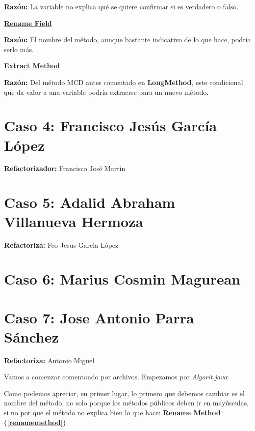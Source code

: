 \documentclass[11pt,a4paper,oneside]{book}
\begin{document}
    \textbf{Razón:} La variable no explica qué se quiere confirmar si es verdadero o falso.
    
    
    
    \hyperref[renamefield]{\textbf{Rename Field}}
    
    \textbf{Razón:} El nombre del método, aunque bastante indicativo de lo que hace, podría serlo más.
    
    
    
    \hyperref[extractmethod]{\textbf{Extract Method}}
    
    \textbf{Razón:} Del método MCD antes comentado en \textbf{LongMethod}, este condicional que da valor a una variable podría extraerse para un nuevo método.
    
    
    
    


\chapter {Caso 4: Francisco Jesús García López}
\textbf{Refactorizador:} Francisco José Martín







\chapter {Caso 5: Adalid Abraham Villanueva Hermoza}
\textbf{Refactoriza:} Fco Jesus Garcia López


\chapter {Caso 6: Marius Cosmin Magurean}

\chapter {Caso 7: Jose Antonio Parra Sánchez}
\textbf{Refactoriza:} Antonio Miguel

Vamos a comenzar comentando por archivos.
Empezamos por \emph{Algorit.java}:



Como podemos apreciar, en primer lugar, lo primero que debemos cambiar es el nombre del método, no solo porque los métodos públicos deben ir en mayúsculas, si no por que el método no explica bien lo que hace: \textbf{Rename Method (\ref{renamemethod})}
\end{document}
